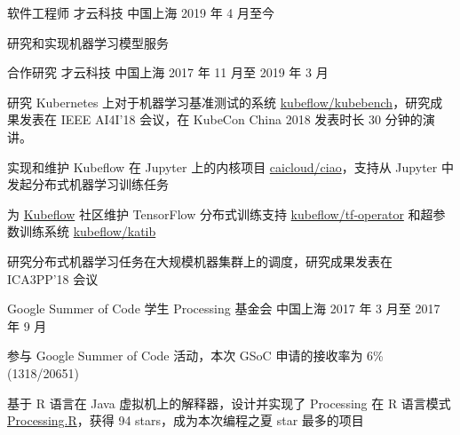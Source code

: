 

\begin{cventries}

  \cventry
    {软件工程师} %
    {才云科技} %
    {中国上海} %
    {2019 年 4 月至今} %
    {
      \begin{cvitems} %
        \item 研究和实现机器学习模型服务
      \end{cvitems}
    }

  \cventry
    {合作研究} %
    {才云科技} %
    {中国上海} %
    {2017 年 11 月至 2019 年 3 月} %
    {
      \begin{cvitems} %
        \item 研究 Kubernetes 上对于机器学习基准测试的系统 \href{https://github.com/kubeflow/kubebench}{kubeflow/kubebench}，研究成果发表在 IEEE AI4I'18 会议，在 KubeCon China 2018 发表时长 30 分钟的演讲。
        \item 实现和维护 Kubeflow 在 Jupyter 上的内核项目 \href{https://github.com/caicloud/ciao}{caicloud/ciao}，支持从 Jupyter 中发起分布式机器学习训练任务
        \item 为 \href{https://github.com/kubeflow/kubeflow}{Kubeflow} 社区维护 TensorFlow 分布式训练支持 \href{https://github.com/kubeflow/tf-operator}{kubeflow/tf-operator} 和超参数训练系统 \href{https://github.com/kubeflow/katib}{kubeflow/katib}
        \item 研究分布式机器学习任务在大规模机器集群上的调度，研究成果发表在 ICA3PP'18 会议
      \end{cvitems}
    }

  \cventry
    {Google Summer of Code 学生} %
    {Processing 基金会} %
    {中国上海} %
    {2017 年 3 月至 2017 年 9 月} %
    {
      \begin{cvitems} %
        \item 参与 Google Summer of Code 活动，本次 GSoC 申请的接收率为 6\%(1318/20651)
        \item 基于 R 语言在 Java 虚拟机上的解释器，设计并实现了 Processing 在 R 语言模式 \href{https://github.com/gaocegege/Processing.R}{Processing.R}，获得 94 stars，成为本次编程之夏 star 最多的项目
      \end{cvitems}
    }


\end{cventries}
